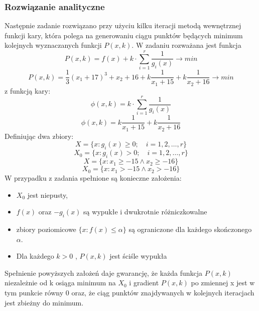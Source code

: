 \documentclass[a4paper,15pt]{article}
\begin{document}
\subsubsection{Rozwiązanie analityczne}
Następnie zadanie rozwiązano przy użyciu kilku iteracji metodą wewnętrznej funkcji kary, która polega na generowaniu ciągu punktów będących minimum kolejnych wyznaczanych funkcji \(P(x,k)\). W zadaniu rozważana jest funkcja 
\begin{equation*}
P(x,k)=f(x)+ k \cdot \sum_{i=1}^{r}\frac{1}{ g_{i}(x)} \rightarrow min
\end{equation*}
\begin{equation*}
P(x,k)= \frac{1}{3}(x_{1}+17)^{3}+x_{2}+16 + k\frac{1}{x_{1}+15} + k\frac{1}{x_{2}+16} \rightarrow min
\end{equation*}
z funkcją kary:
\begin{equation*}
\phi(x,k) = k \cdot \sum_{i=1}^{r}\frac{1}{ g_{i}(x)}
\end{equation*}
\begin{equation*}
\phi(x,k) = k\frac{1}{x_{1}+15} + k\frac{1}{x_{2}+16}
\end{equation*}
Definiując dwa zbiory: \\
\begin{equation*}
X=\{x: g_{i}(x) \geq 0 ; \quad i =1,2, \dots ,r\}
\end{equation*}
\begin{equation*}
X_{0}=\{x: g_{i}(x) > 0 ; \quad i =1,2, \dots ,r\}
\end{equation*}
\begin{equation*}
X=\{x: x_{1} \geq -15 \land x_{2} \geq -16 \}
\end{equation*}
\begin{equation*}
X_{0}=\{x: x_{1} > -15 \land x_{2} > -16 \}
\end{equation*}
W przypadku z zadania spełnione są konieczne założenia: 
\begin{itemize}
\item \( X_{0} \) jest niepusty,
\item \( f(x) \) oraz \(-g_{i}(x) \) są wypukłe i dwukrotnie różniczkowalne
\item zbiory poziomicowe \( \{ x: f(x) \leq \alpha \} \) są ograniczone dla każdego skończonego \( \alpha \).
\item Dla każdego \( k > 0 \) , \( P(x,k) \) jest ściśle wypukła 
\end{itemize}
Spełnienie powyższych założeń daje gwarancję, że każda funkcja \( P(x,k) \) niezależnie od k osiąga minimum na \( X_{0} \) i gradient \( P(x,k) \) po zmiennej x jest w tym punkcie równy 0 oraz, że ciąg punktów znajdywanych w kolejnych iteracjach jest zbieżny do minimum. 
\end{document}
